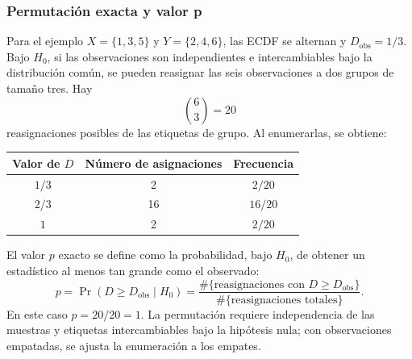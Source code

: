 \begin{center}
\end{center}

\subsubsection{Permutación exacta y valor p}

Para el ejemplo $X=\{1,3,5\}$ y $Y=\{2,4,6\}$, las ECDF se alternan y $D_{\mathrm{obs}}=1/3$. Bajo $H_0$, si las observaciones son independientes e intercambiables bajo la distribución común, se pueden reasignar las seis observaciones a dos grupos de tamaño tres. Hay
\[
  {\binom{6}{3}}=20
\]
reasignaciones posibles de las etiquetas de grupo. Al enumerarlas, se obtiene:
\begin{center}
\begin{tabular}{@{}ccc@{}}
  \toprule
  Valor de $D$ & Número de asignaciones & Frecuencia\\
  \midrule
  $1/3$ & 2  & $2/20$\\
  $2/3$ & 16 & $16/20$\\
  $1$   & 2  & $2/20$\\
  \bottomrule
\end{tabular}
\end{center}
El valor $p$ exacto se define como la probabilidad, bajo $H_0$, de obtener un estadístico al menos tan grande como el observado:
\[
  p=\Pr(D\ge D_{\mathrm{obs}}\mid H_0)
   =\frac{\#\{\text{reasignaciones con }D\ge D_{\mathrm{obs}}\}}
          {\#\{\text{reasignaciones totales}\}}.
\]
En este caso $p=20/20=1$. La permutación requiere independencia de las muestras y etiquetas intercambiables bajo la hipótesis nula; con observaciones empatadas, se ajusta la enumeración a los empates.

